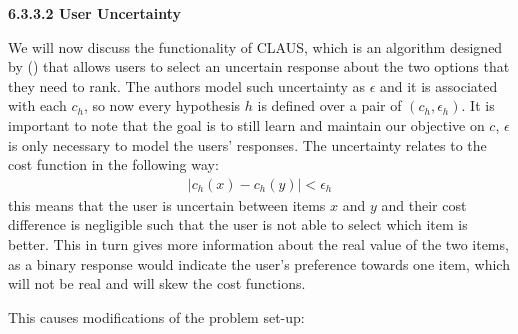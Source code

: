 \documentclass[
  letterpaper,
  DIV=11,
  numbers=noendperiod,
  oneside]{scrreprt}
\theoremstyle{remark}
\begin{document}
\textbf{6.3.3.2 User Uncertainty}

We will now discuss the functionality of CLAUS, which is an algorithm
designed by () that allows
users to select an uncertain response about the two options that they
need to rank. The authors model such uncertainty as \(\epsilon\) and it
is associated with each \(c_h\), so now every hypothesis \(h\) is
defined over a pair of \((c_h, \epsilon_h)\). It is important to note
that the goal is to still learn and maintain our objective on \(c\),
\(\epsilon\) is only necessary to model the users' responses. The
uncertainty relates to the cost function in the following way:
\[\begin{aligned}
    |c_h(x) - c_h(y)| < \epsilon_h
\end{aligned}\] this means that the user is uncertain between items
\(x\) and \(y\) and their cost difference is negligible such that the
user is not able to select which item is better. This in turn gives more
information about the real value of the two items, as a binary response
would indicate the user's preference towards one item, which will not be
real and will skew the cost functions.

This causes modifications of the problem set-up:
\end{document}

